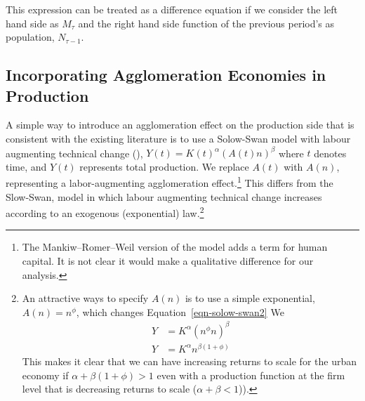 This expression can be treated as a difference equation if we consider the left hand side as $M_\tau$ and the right hand side  function of the previous period's as population, $N_{\tau-1}$.

 \color{black}

 
\color{red}


\subsection{Incorporating Agglomeration Economies in Production} \label{sec-agglomeration-production}
A simple way  to introduce an agglomeration effect on the production side that is consistent with the existing literature is  to use a Solow-Swan model with labour augmenting technical change (\cite{Solow56, Swan}), $Y(t)=K(t)^{\alpha }(A(t)n)^{\beta }$ where $t$ denotes time,  %
 and $Y (t )$  represents total production. 
We %
 replace $A(t)$ %
  with $A(n)$, representing a labor-augmenting agglomeration effect.\footnote{The Mankiw–Romer–Weil version of the model adds a term for human capital.  It is not clear it would make a qualitative difference for our analysis.}  This differs from  the Slow-Swan, model in which labour augmenting technical change increases according to an exogenous (exponential) law.\footnote{An attractive ways to specify $A(n)$  is to use a simple exponential, $A(n)=n^\phi$, which changes Equation~\ref{eqn-solow-swan2} 
  We %
\begin{eqnarray}
 Y&=K^{\alpha }(n^{\phi }n)^{\beta}  \nonumber\\
 Y&=K^{\alpha }n^{\beta(1 +\phi)}
\label{eqn-solow-swan1}
\end{eqnarray}
This makes it clear that we can have increasing returns to scale for the urban economy if  $\alpha + \beta(1+ \phi)>1$ even with a production function at the firm level that is decreasing returns to scale ($\alpha +\beta<1$)).\label{footnote-psi}}  
  

